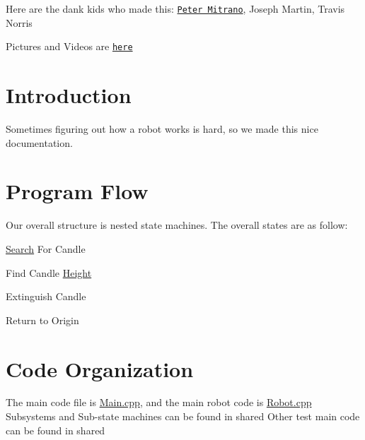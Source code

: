 Here are the dank kids who made this\-:  \href{https://petermitrano.github.io}{\tt Peter Mitrano},  Joseph Martin,  Travis Norris

Pictures and Videos are \href{https://photos.google.com/album/AF1QipMH7TU09SdCnFJVnUSU03R5djZ0XUy_WJTzKOHU}{\tt here}\hypertarget{index_Introduction}{}\section{Introduction}\label{index_Introduction}
Sometimes figuring out how a robot works is hard, so we made this nice documentation.\hypertarget{index_Flow}{}\section{Program Flow}\label{index_Flow}
Our overall structure is nested state machines. The overall states are as follow\-:


\begin{DoxyItemize}
\item \hyperlink{classSearch}{Search} For Candle
\item Find Candle \hyperlink{classHeight}{Height}
\item Extinguish Candle
\item Return to Origin
\end{DoxyItemize}\hypertarget{index_Organiztion}{}\section{Code Organization}\label{index_Organiztion}
The main code file is \hyperlink{Main_8cpp}{Main.\-cpp}, and the main robot code is \hyperlink{Robot_8cpp}{Robot.\-cpp} Subsystems and Sub-\/state machines can be found in shared Other test main code can be found in shared 